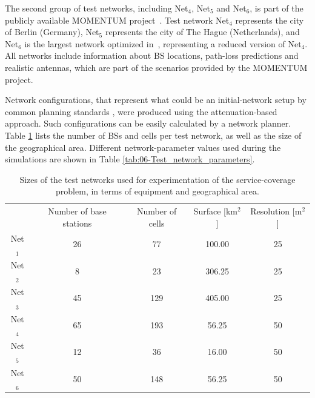 The second group of test networks, including Net$_{4}$, Net$_{5}$
and Net$_{6}$, is part of the publicly available MOMENTUM project~\cite{Momentum.project}.
Test network Net$_{4}$ represents the city of Berlin (Germany), Net$_{5}$
represents the city of The Hague (Netherlands), and Net$_{6}$ is
the largest network optimized in~\cite{Siomina:Minimum.pilot.power.for.service.coverage},
representing a reduced version of Net$_{4}$. All networks include
information about BS locations, path-loss predictions and realistic
antennas, which are part of the scenarios provided by the MOMENTUM
project.

Network configurations, that represent what could be an initial-network
setup by common planning standards \cite{Holma_WCDMA.for.UMTS:2005},
were produced using the attenuation-based approach. Such configurations
can be easily calculated by a network planner. Table \ref{tab:06-Test_network_sizes}
lists the number of BSs and cells per test network, as well as the
size of the geographical area. Different network-parameter values
used during the simulations are shown in Table \ref{tab:06-Test_network_parameters}.

\begin{table}
\caption{Sizes of the test networks used for experimentation of the service-coverage
problem, in terms of equipment and geographical area.\emph{\label{tab:06-Test_network_sizes}}}


\centering

{\small{}}%
\begin{tabular}{ccccc}
\cmidrule{2-5} 
 & {\small{Number of base stations}} & {\small{Number of cells}} & {\small{Surface {[}km$^{2}${]}}} & {\small{Resolution {[}m$^{2}${]}}}\tabularnewline\addlinespace
\midrule
{\small{Net$_{1}$}} & {\small{26}} & {\small{77}} & {\small{100.00}} & {\small{25}}\tabularnewline
{\small{Net$_{2}$}} & {\small{8}} & {\small{23}} & {\small{306.25}} & {\small{25}}\tabularnewline
{\small{Net$_{3}$}} & {\small{45}} & {\small{129}} & {\small{405.00}} & {\small{25}}\tabularnewline
{\small{Net$_{4}$}} & {\small{65}} & {\small{193}} & {\small{56.25}} & {\small{50}}\tabularnewline
{\small{Net$_{5}$}} & {\small{12}} & {\small{36}} & {\small{16.00}} & {\small{50}}\tabularnewline
{\small{Net$_{6}$}} & {\small{50}} & {\small{148}} & {\small{56.25}} & {\small{50}}\tabularnewline
\bottomrule
\end{tabular}
\end{table}


